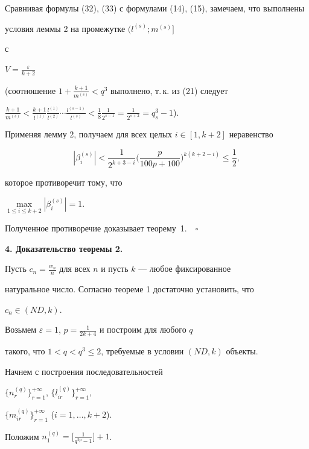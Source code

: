 Сравнивая формулы (32), (33) с формулами (14), (15), замечаем, что выполнены 


условия леммы 2 на промежутке $ (l^{(s)}; m^{(s)}]$


с


$V=\frac{\varepsilon}{k+2}$


(соотношение $1+\frac{k+1}{m^{(s)}}<q^3$ выполнено, т.\,к. из (21) следует


$\frac{k+1}{m^{(s)}}<\frac{k+1}{l^{(1)}} \frac{l^{(1)}}{l^{(2)}} \dotsb 


\frac{l^{(s-1)}}{l^{(s)}}<\frac{1}{8}


\frac{1}{2^{s-1}}=\frac{1}{2^{s+2}}=q_s^3-1$). 





Применяя лемму 2, получаем для всех целых $i \in [1, k+2]$ неравенство


$$


|\beta_i^{(s)}|<\frac{1}{2^{k+3-i}}\bigg(\frac{p}{100p+100}\bigg)^{k(k+2 -i)}


\le \frac{1}{2},


$$ 


которое противоречит тому, что


$\max\limits_{1 \le i \le k+2} | \beta_i^{(s)} |=1$.


Полученное противоречие доказывает теорему~1.$\quad\square$ 


\medskip





{\bf 4. Доказательство теоремы 2.}


Пусть $c_n=\frac{w_n}{n}$ для всех $n$ и пусть $k$ --- любое фиксированное 


натуральное число. Согласно теореме 1 достаточно установить, что 


$c_n \in (ND, k)$.





Возьмем $\varepsilon=1$, $p=\frac{1}{2k+4}$ и построим для любого $q$ 


такого, что $1<q<q^3 \le 2$, требуемые в условии $(ND, k)$ объекты.


Начнем с построения последовательностей


$\{n_r^{(q)}\}_{r=1}^{+\infty}$, $\{l_{ir}^{(q)} \}_{r=1}^{+\infty}$, 


$\{m_{ir}^{(q)} \}_{r=1}^{+\infty}$ ($i=1, \dotsc, k+2$).


Положим $n_1^{(q)}=\big[\frac{1}{q^{2p}-1}\big]+1$.


